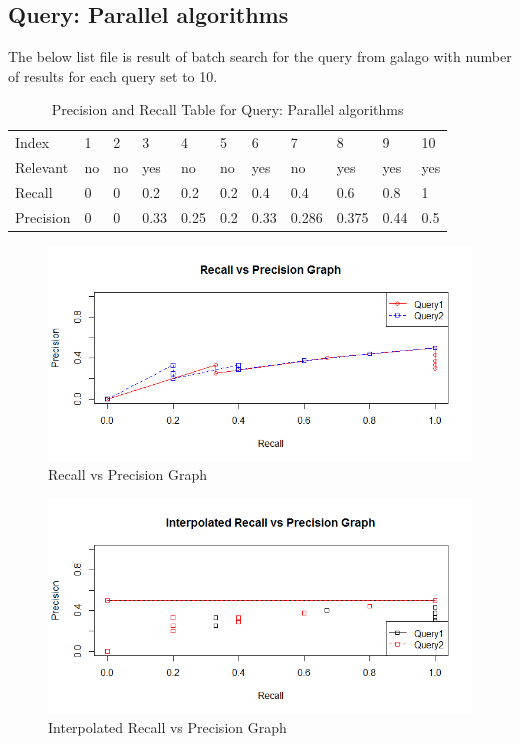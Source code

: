 \documentclass[12pt]{report}
\begin{document}
\subsection{Query: Parallel algorithms}

The below list file is result of batch search for the query from galago with number of results for each query set to 10.


\begin{table}[]
\centering
\caption{Precision and Recall Table for Query: Parallel algorithms }
\label{my-label}
\begin{tabular}{lllllllllll}
Index     & 1   & 2     & 3     & 4     & 5     & 6     & 7     & 8     & 9    & 10  \\
Relevant  & no  & no   & yes   & no   & no   & yes   & no    & yes   & yes  & yes  \\
Recall    & 0 & 0 & 0.2 & 0.2 & 0.2 & 0.4 & 0.4 & 0.6 & 0.8    & 1   \\
Precision & 0 & 0   & 0.33  & 0.25  & 0.2   & 0.33 & 0.286 & 0.375  & 0.44 & 0.5
\end{tabular}
\end{table}

\begin{figure}[ht]
  \centering
  \includegraphics[width=1\textwidth]{Problem8_4/RecallvsPrecision.png}
  \caption{Recall vs Precision Graph}
  \label{fig:1}
\end{figure} 

\begin{figure}[ht]
  \centering
  \includegraphics[width=1\textwidth]{Problem8_4/InterpolatedRecallvsPrecision.png}
  \caption{Interpolated Recall vs Precision Graph}
  \label{fig:1}
\end{figure}
\end{document}
